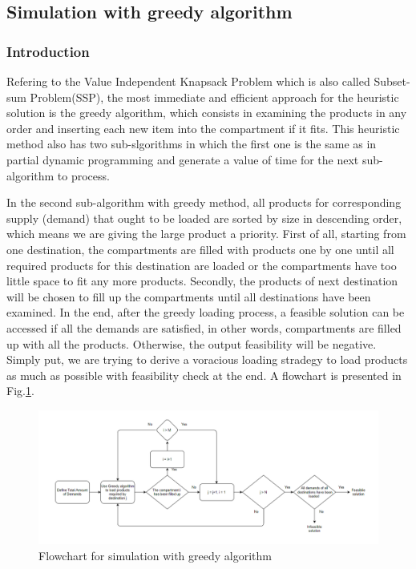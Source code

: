 \documentclass{article}
\begin{document}
\subsection{Simulation with greedy algorithm}

\subsubsection{Introduction}
Refering to the Value Independent Knapsack Problem which is also called Subset-sum Problem(SSP), the most immediate and efficient approach for the heuristic solution is the greedy algorithm, which consists in examining the products in any order and inserting each new item into the compartment if it fits. This heuristic method also has two sub-slgorithms in which the first one is the same as in partial dynamic programming and generate a value of time for the next sub-algorithm to process.

In the second sub-algorithm with greedy method, all products for corresponding supply (demand) that ought to be loaded are sorted by size in descending order, which means we are giving the large product a priority. First of all, starting from one destination, the compartments are filled with products one by one until all required products for this destination are loaded or the compartments have too little space to fit any more products. Secondly, the products of next destination will be chosen to fill up the compartments until all destinations have been examined. In the end, after the greedy loading process, a feasible solution can be accessed if all the demands are satisfied, in other words, compartments are filled up with all the products. Otherwise, the output feasibility will be negative. Simply put, we are trying to derive a voracious loading stradegy to load products as much as possible with feasibility check at the end. A flowchart is presented in Fig.\ref{fig:flowchartgreedy}.

\begin{figure}[ht]
    \centering
    \includegraphics[scale=0.6]{flowchartgreedy.png}
    \caption{Flowchart for simulation with greedy algorithm}
    \label{fig:flowchartgreedy}
\end{figure}
\end{document}
